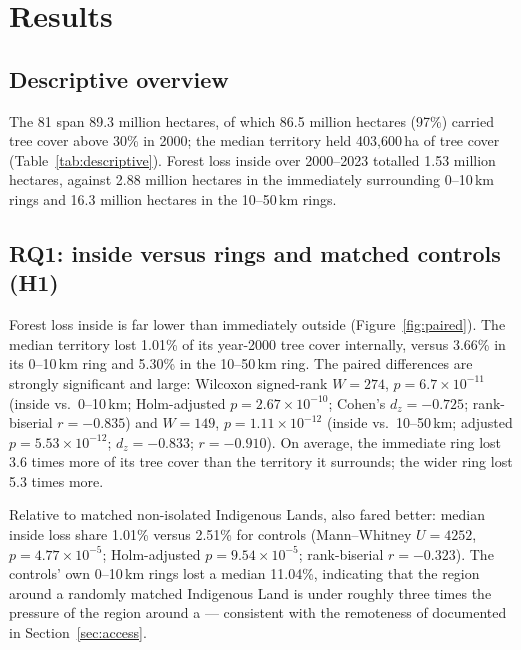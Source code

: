 \section{Results}\label{sec:results}

\subsection{Descriptive overview}
The 81 \tipi{} span 89.3 million hectares, of which 86.5 million hectares (97\%) carried tree cover above 30\% in 2000; the median territory held 403{,}600\,ha of tree cover (Table~\ref{tab:descriptive}). Forest loss inside \tipi{} over 2000--2023 totalled 1.53 million hectares, against 2.88 million hectares in the immediately surrounding 0--10\,km rings and 16.3 million hectares in the 10--50\,km rings.

\begin{table}[htbp]
\centering
\caption{Forest-cover loss 2000--2023 by zone and group. Loss share is the fraction of year-2000 tree cover (canopy $>$30\%) lost; IQR in brackets. ``Controls'' are matched non-isolated Indigenous Lands (inside zone only shown; $n=155$).}
\label{tab:descriptive}
\small

\end{table}

\subsection{RQ1: inside versus rings and matched controls (H1)}
Forest loss inside \tipi{} is far lower than immediately outside (Figure~\ref{fig:paired}). The median territory lost 1.01\% of its year-2000 tree cover internally, versus 3.66\% in its 0--10\,km ring and 5.30\% in the 10--50\,km ring. The paired differences are strongly significant and large: Wilcoxon signed-rank $W=274$, $p=6.7\times10^{-11}$ (inside vs.\ 0--10\,km; Holm-adjusted $p=2.67\times10^{-10}$; Cohen's $d_z=-0.725$; rank-biserial $r=-0.835$) and $W=149$, $p=1.11\times10^{-12}$ (inside vs.\ 10--50\,km; adjusted $p=5.53\times10^{-12}$; $d_z=-0.833$; $r=-0.910$). On average, the immediate ring lost 3.6 times more of its tree cover than the territory it surrounds; the wider ring lost 5.3 times more.

Relative to matched non-isolated Indigenous Lands, \tipi{} also fared better: median inside loss share 1.01\% versus 2.51\% for controls (Mann--Whitney $U=4252$, $p=4.77\times10^{-5}$; Holm-adjusted $p=9.54\times10^{-5}$; rank-biserial $r=-0.323$). The controls' own 0--10\,km rings lost a median 11.04\%, indicating that the region around a randomly matched Indigenous Land is under roughly three times the pressure of the region around a \tipi{} --- consistent with the remoteness of \tipi{} documented in Section~\ref{sec:access}.

